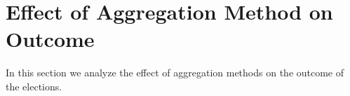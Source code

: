 \documentclass[letterpaper]{article} %
\newcommand{\mes}{ES}
\begin{document}






\section{  Effect of Aggregation Method on Outcome}  


\label{sec:aggregation}
In  this section we  analyze the effect of aggregation methods  on the outcome of the elections.

\end{document}
